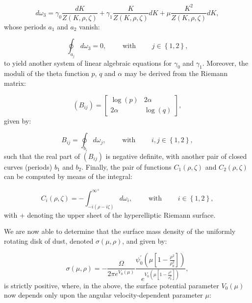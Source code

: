 \documentclass{article}
\begin{document}
\begin{equation}
d \omega_3 = \gamma_0 \frac{d K}{Z \left( K, \rho, \zeta \right)} + \gamma_1 \frac{K}{Z \left( K, \rho, \zeta \right)} d K + \mu \frac{K^2}{Z \left( K, \rho, \zeta \right)} d K,
\end{equation}
whose periods ${a_1}$ and ${a_2}$ vanish:

\begin{equation}
\oint_{a_j} d \omega_3 = 0, \qquad \text{ with } \qquad j \in \left\lbrace 1, 2 \right\rbrace,
\end{equation}
to yield another system of linear algebraic equations for ${\gamma_0}$ and ${\gamma_1}$. Moreover, the moduli of the theta function $p$, $q$ and ${\alpha}$ may be derived from the Riemann matrix:

\begin{equation}
\left( B_{i j} \right) = \begin{bmatrix}
\log \left( p \right) & 2 \alpha\\
2 \alpha & \log \left( q \right)
\end{bmatrix},
\end{equation}
given by:

\begin{equation}
B_{i j} = \oint_{b_i} d \omega_j, \qquad \text{ with } \qquad i, j \in \left\lbrace 1, 2 \right\rbrace,
\end{equation}
such that the real part of ${\left( B_{i j} \right)}$ is negative definite, with another pair of closed curves (periods) ${b_1}$ and ${b_2}$. Finally, the pair of functions ${C_1 \left( \rho, \zeta \right)}$ and ${C_2 \left( \rho, \zeta \right)}$ can be computed by means of the integral:

\begin{equation}
C_i \left( \rho, \zeta \right) = - \int_{- i \left( \rho - i \zeta \right)}^{\infty^{+}} d \omega_i, \qquad \text{ with } \qquad i \in \left\lbrace 1, 2 \right\rbrace,
\end{equation}
with ${+}$ denoting the upper sheet of the hyperelliptic Riemann surface.

We are now able to determine that the surface mass density of the uniformly rotating disk of dust, denoted ${\sigma \left( \mu, \rho \right)}$, and given by:

\begin{equation}
\sigma \left( \mu, \rho \right) = - \frac{\Omega}{2 \pi e^{V_0 \left( \mu \right)}} \frac{\psi_{0}^{\prime} \left( \mu \left[ 1 - \frac{\rho^2}{\rho_{0}^{2}} \right] \right)}{e^{V_0 \left( \mu \left[ 1 - \frac{\rho^2}{\rho_{0}^{2}} \right] \right)}},
\end{equation}
is strictly positive, where, in the above, the surface potential parameter ${V_0 \left( \mu \right)}$ now depends only upon the angular velocity-dependent parameter ${\mu}$:
\end{document}
